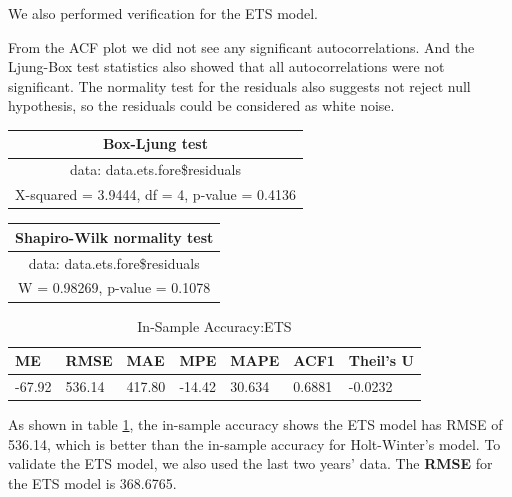 \documentclass[journal, a4paper]{IEEEtran}
\begin{document}
We also performed verification for the ETS model.

 From the ACF plot we did not see any significant autocorrelations. And the Ljung-Box test statistics also showed that all autocorrelations were not significant.  The normality test for the residuals also suggests not reject null hypothesis, so the residuals could be considered as white noise.
 \begin{table}[H]
 \centering
\begin{tabular}{|c|}
\hline
Box-Ljung test  \\ \hline
data:  data.ets.fore\$residuals \\  \hline
 X-squared = 3.9444, df = 4, p-value = 0.4136  \\
\hline
\end{tabular}
\end{table}
\begin{table}[H]
\centering
\begin{tabular}{|c|}
\hline
Shapiro-Wilk normality test   \\ \hline
data:  data.ets.fore\$residuals  \\  \hline
W = 0.98269, p-value = 0.1078  \\
\hline
\end{tabular}
\end{table}
 \begin{table}[H]
 \caption{In-Sample Accuracy:ETS}
 \label{table:ets_in_accuracy}
\centering
 \begin{tabular}{|p{0.75cm}|p{0.75cm}|p{0.75cm}|p{0.75cm}|p{0.75cm}|p{0.75cm}|p{1.2cm}|}
 \hline
 ME     &  RMSE      &  MAE      &   MPE    &   MAPE   &      ACF1  & Theil's U  \\ \hline
 -67.92  & 536.14  & 417.80  & -14.42  & 30.634 & 0.6881  & -0.0232         \\
 \hline
 \end{tabular}
 \end{table}
 As shown in table \ref{table:ets_in_accuracy}, the in-sample accuracy shows the ETS model has RMSE of 536.14, which is better than the in-sample accuracy for Holt-Winter's model.
To validate the ETS model, we also used the last two years' data. The \textbf{RMSE} for the ETS model is 368.6765.
\end{document}
